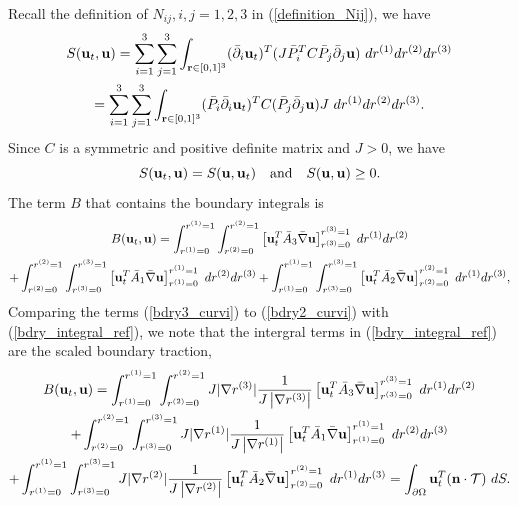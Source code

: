 \documentclass[a4paper]{article}
\begin{document}
Recall the definition of $N_{ij}, i,j = 1,2,3$ in (\ref{definition_Nij}), we have
\begin{multline*}
S({\bf u}_t,{\bf u}) = \sum_{i=1}^3\sum_{j=1}^3 \int_{{\bf r}\in[0,1]^3} (\bar{\partial}_i {\bf u}_t)^T(J\bar{P}_i^TC\bar{P}_j\bar{\partial}_j {\bf u})\ dr^{(1)}dr^{(2)}dr^{(3)} \\
= \sum_{i=1}^3\sum_{j=1}^3 \int_{{\bf r}\in[0,1]^3} (\bar{P}_i\bar{\partial}_i {\bf u}_t)^TC(\bar{P}_j\bar{\partial}_j {\bf u}) J\ dr^{(1)}dr^{(2)}dr^{(3)}.
\end{multline*}
Since $C$ is a symmetric and positive definite matrix and $J > 0$, we have 
\begin{equation*}
S({\bf u}_t,{\bf u}) = S({\bf u},{\bf u}_t) \ \ \  \text{and} \ \ \ S({\bf u},{\bf u}) \geq 0.
\end{equation*}
The term $B$ that contains the boundary integrals is
\begin{multline}\label{bdry_integral_ref}
B({\bf u}_t,{\bf u}) = \int_{r^{(1)} = 0}^{r^{(1)} = 1} \int_{r^{(2)} = 0}^{r^{(2)} = 1}  \left[{\bf u}_t^T\bar{A}_3\bar{\nabla} {\bf u}\right]_{r^{(3)}=0}^{r^{(3)}=1} \ dr^{(1)}dr^{(2)}\\
+ \int_{r^{(2)} = 0}^{r^{(2)} = 1} \int_{r^{(3)} = 0}^{r^{(3)} = 1}  \left[{\bf u}_t^T\bar{A}_1\bar{\nabla} {\bf u}\right]_{r^{(1)}=0}^{r^{(1)}=1}\ dr^{(2)}dr^{(3)} +\int_{r^{(1)} = 0}^{r^{(1)} = 1} \int_{r^{(3)} = 0}^{r^{(3)} = 1}  \left[{\bf u}_t^T\bar{A}_2\bar{\nabla} {\bf u}\right]_{r^{(2)}=0}^{r^{(2)}=1} \ dr^{(1)}dr^{(3)},
\end{multline}
Comparing the terms (\ref{bdry3_curvi}) to (\ref{bdry2_curvi}) with (\ref{bdry_integral_ref}), we note that the intergral terms in (\ref{bdry_integral_ref}) are the scaled boundary traction,
\begin{multline}\label{bdry_integral_curvi}
B({\bf u}_t,{\bf u}) = \int_{r^{(1)} = 0}^{r^{(1)} = 1} \int_{r^{(2)} = 0}^{r^{(2)} = 1} J|\nabla r^{(3)}|\frac{1}{J\left|\nabla r^{(3)}\right|} \left[{\bf u}_t^T\bar{A}_3\bar{\nabla} {\bf u}\right]_{r^{(3)}=0}^{r^{(3)}=1} \ dr^{(1)}dr^{(2)}\\
+ \int_{r^{(2)} = 0}^{r^{(2)} = 1} \int_{r^{(3)} = 0}^{r^{(3)} = 1} J|\nabla r^{(1)}|\frac{1}{J\left|\nabla r^{(1)}\right|}  \left[{\bf u}_t^T\bar{A}_1\bar{\nabla} {\bf u}\right]_{r^{(1)}=0}^{r^{(1)}=1}\ dr^{(2)}dr^{(3)} \\
+\int_{r^{(1)} = 0}^{r^{(1)} = 1} \int_{r^{(3)} = 0}^{r^{(3)} = 1} J|\nabla r^{(2)}|\frac{1}{J\left|\nabla r^{(2)}\right|}  \left[{\bf u}_t^T\bar{A}_2\bar{\nabla} {\bf u}\right]_{r^{(2)}=0}^{r^{(2)}=1} \ dr^{(1)}dr^{(3)} = \int_{\partial \Omega} {\bf u}_t^T({\bf n}\cdot\mathcal{T})\ dS.
\end{multline}
\end{document}
